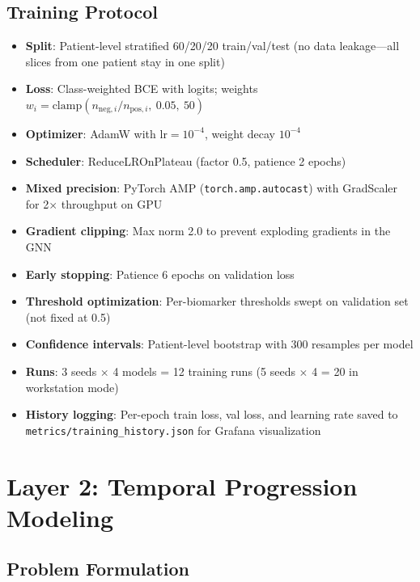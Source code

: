 \documentclass[12pt,a4paper]{article}
\begin{document}
\subsection{Training Protocol}

\begin{itemize}[nosep]
  \item \textbf{Split}: Patient-level stratified 60/20/20 train/val/test (no data leakage---all slices from one patient stay in one split)
  \item \textbf{Loss}: Class-weighted BCE with logits; weights $w_i = \text{clamp}(n_{\text{neg},i} / n_{\text{pos},i},\ 0.05,\ 50)$
  \item \textbf{Optimizer}: AdamW with $\text{lr}=10^{-4}$, weight decay $10^{-4}$
  \item \textbf{Scheduler}: ReduceLROnPlateau (factor 0.5, patience 2 epochs)
  \item \textbf{Mixed precision}: PyTorch AMP (\texttt{torch.amp.autocast}) with GradScaler for 2$\times$ throughput on GPU
  \item \textbf{Gradient clipping}: Max norm 2.0 to prevent exploding gradients in the GNN
  \item \textbf{Early stopping}: Patience 6 epochs on validation loss
  \item \textbf{Threshold optimization}: Per-biomarker thresholds swept on validation set (not fixed at 0.5)
  \item \textbf{Confidence intervals}: Patient-level bootstrap with 300 resamples per model
  \item \textbf{Runs}: 3 seeds $\times$ 4 models = 12 training runs (5 seeds $\times$ 4 = 20 in workstation mode)
  \item \textbf{History logging}: Per-epoch train loss, val loss, and learning rate saved to \texttt{metrics/training\_history.json} for Grafana visualization
\end{itemize}

\section{Layer 2: Temporal Progression Modeling}

\subsection{Problem Formulation}
\end{document}
